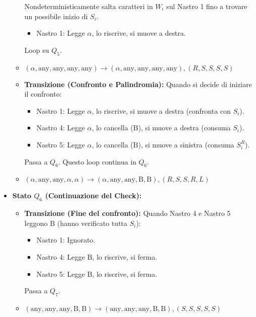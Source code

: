 \documentclass[a4paper, 11pt]{book} %
\theoremstyle{definition}
\newcommand{\B}{\text{B}} %
\newcommand{\alphaSym}{\alpha} %
\begin{document}
\begin{itemize}
\begin{itemize}
                Nondeterministicamente salta caratteri in $W_i$ sul Nastro 1 fino a trovare un possibile inizio di $S_i$.
                \begin{itemize}
                    \item Nastro 1: Legge $\alpha$, lo riscrive, si muove a destra.
                \end{itemize}
                Loop su $Q_5$.
                \item $(\alpha, \text{any}, \text{any}, \text{any}, \text{any}) \to (\alpha, \text{any}, \text{any}, \text{any}, \text{any}), (R,S,S,S,S)$
            \item \textbf{Transizione (Confronto e Palindromia):}
                Quando si decide di iniziare il confronto:
                \begin{itemize}
                    \item Nastro 1: Legge $\alphaSym$, lo riscrive, si muove a destra (confronta con $S_i$).
                    \item Nastro 4: Legge $\alphaSym$, lo cancella ($\B$), si muove a destra (consuma $S_i$).
                    \item Nastro 5: Legge $\alphaSym$, lo cancella ($\B$), si muove a sinistra (consuma $S_i^R$).
                \end{itemize}
                Passa a $Q_6$. Questo loop continua in $Q_6$.
                \item $(\alphaSym, \text{any}, \text{any}, \alphaSym, \alphaSym) \to (\alphaSym, \text{any}, \text{any}, \B, \B), (R,S,S,R,L)$
        \end{itemize}
    \item \textbf{Stato $Q_6$ (Continuazione del Check):}
        \begin{itemize}
            \item \textbf{Transizione (Fine del confronto):}
                Quando Nastro 4 e Nastro 5 leggono $\B$ (hanno verificato tutta $S_i$):
                \begin{itemize}
                    \item Nastro 1: Ignorato.
                    \item Nastro 4: Legge $\B$, lo riscrive, si ferma.
                    \item Nastro 5: Legge $\B$, lo riscrive, si ferma.
                \end{itemize}
                Passa a $Q_7$.
                \item $(\text{any}, \text{any}, \text{any}, \B, \B) \to (\text{any}, \text{any}, \text{any}, \B, \B), (S,S,S,S,S)$

\end{itemize}
\end{itemize}
\end{document}
